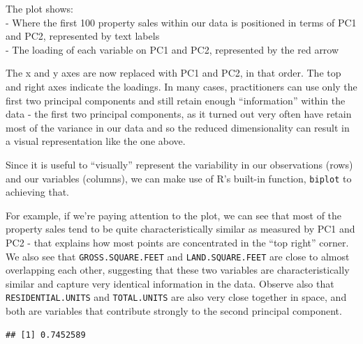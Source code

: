 \documentclass[]{article}
\newenvironment{Shaded}{\begin{snugshade}}{\end{snugshade}}
\newcommand{\KeywordTok}[1]{\textcolor[rgb]{0.13,0.29,0.53}{\textbf{#1}}}
\newcommand{\NormalTok}[1]{#1}
\newcommand{\OperatorTok}[1]{\textcolor[rgb]{0.81,0.36,0.00}{\textbf{#1}}}
\begin{document}
The plot shows:\\
- Where the first 100 property sales within our data is positioned in
terms of PC1 and PC2, represented by text labels\\
- The loading of each variable on PC1 and PC2, represented by the red
arrow

The x and y axes are now replaced with PC1 and PC2, in that order. The
top and right axes indicate the loadings. In many cases, practitioners
can use only the first two principal components and still retain enough
``information'' within the data - the first two principal components, as
it turned out very often have retain most of the variance in our data
and so the reduced dimensionality can result in a visual representation
like the one above.

Since it is useful to ``visually'' represent the variability in our
observations (rows) and our variables (columns), we can make use of R's
built-in function, \texttt{biplot} to achieving that.

For example, if we're paying attention to the plot, we can see that most
of the property sales tend to be quite characteristically similar as
measured by PC1 and PC2 - that explains how most points are concentrated
in the ``top right'' corner. We also see that \texttt{GROSS.SQUARE.FEET}
and \texttt{LAND.SQUARE.FEET} are close to almost overlapping each
other, suggesting that these two variables are characteristically
similar and capture very identical information in the data. Observe also
that \texttt{RESIDENTIAL.UNITS} and \texttt{TOTAL.UNITS} are also very
close together in space, and both are variables that contribute strongly
to the second principal component.

\begin{Shaded}
\end{Shaded}

\begin{verbatim}
## [1] 0.7452589
\end{verbatim}

\begin{Shaded}
\end{Shaded}
\end{document}
